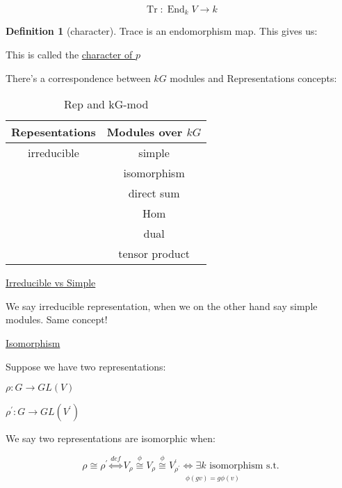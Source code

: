 \documentclass{article}
\theoremstyle{definition}
\newtheorem*{definition}{Definition}
\newcommand{\End}{\operatorname{End}}
\newcommand{\Tr}{\operatorname{Tr}}
\begin{document}
\[
    \Tr:\End_k V \to k
\]

\begin{definition}[character]
    Trace is an endomorphism map. This gives us:

    \begin{center}
    \end{center}

    This is called the \underline{character of \(p\)} 
\end{definition}

There's a correspondence between \(kG\) modules and Representations concepts:

\begin{table}[H]
    \centering
    \begin{tabular}{c|c}
        \toprule
            Repesentations &  Modules over \(kG\)  \\
        \midrule
            irreducible &  simple \\
             &  isomorphism \\
             &  direct sum \\
             &  Hom \\
             &  dual \\
             &  tensor product \\
        \bottomrule
    \end{tabular}
    \caption{Rep and kG-mod}
    \label{tab:repmod}
\end{table}

\underline{Irreducible vs Simple} 

We say irreducible representation, when we on the other hand say simple modules. Same concept!

\underline{Isomorphism} 

Suppose we have two representations:

\(\rho : G \to GL(V)\) 

\(\rho ^{\prime} : G \to GL(V^{\prime})\) 

We say two representations are isomorphic when:

\[
    \rho \cong \rho ^{\prime} \overset{def}{\iff} V_{\rho} \overset{\phi}{\cong} \underset{\phi(gv)=g \phi(v)}{V_{\rho} \overset{\phi}{\cong} V^{\prime} _{\rho ^{\prime}} \iff \exists k \text{ isomorphism s.t.} } 
\]
\end{document}
